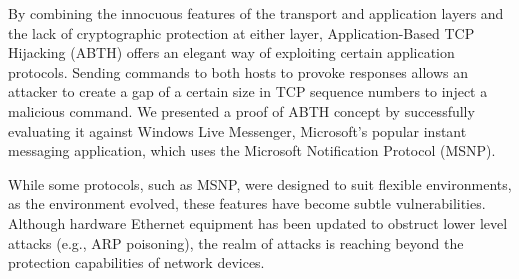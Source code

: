 \documentclass{sig-alternate}
\begin{document}
By combining the innocuous features of the transport and application layers and the lack of cryptographic protection at either layer, Application-Based TCP Hijacking (ABTH) offers an elegant way of exploiting certain application protocols.
Sending commands to both hosts to provoke responses allows an attacker to create a gap of a certain size in TCP sequence numbers to inject a malicious command.
We presented a proof of ABTH concept by successfully evaluating it against Windows Live Messenger, Microsoft's popular instant messaging application, which uses the Microsoft Notification Protocol (MSNP).

While some protocols, such as MSNP, were designed to suit flexible environments, as the environment evolved, these features have become subtle vulnerabilities.
Although hardware Ethernet equipment has been updated to obstruct lower level attacks (e.g., ARP poisoning), the realm of attacks is reaching beyond the protection capabilities of network devices.



\end{document}
